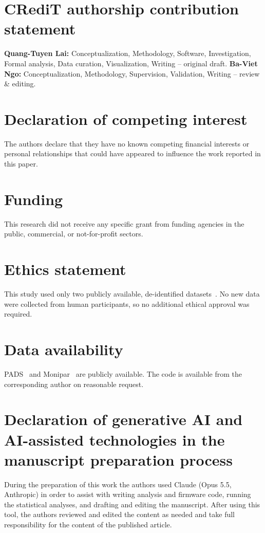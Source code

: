 \documentclass[preprint,12pt]{elsarticle}
\begin{document}
\section*{CRediT authorship contribution statement}
\textbf{Quang-Tuyen Lai:} Conceptualization, Methodology, Software, Investigation, Formal analysis, Data curation, Visualization, Writing -- original draft. \textbf{Ba-Viet Ngo:} Conceptualization, Methodology, Supervision, Validation, Writing -- review \& editing.

\section*{Declaration of competing interest}
The authors declare that they have no known competing financial interests or personal relationships that could have appeared to influence the work reported in this paper.

\section*{Funding}
This research did not receive any specific grant from funding agencies in the public, commercial, or not-for-profit sectors.

\section*{Ethics statement}
This study used only two publicly available, de-identified datasets~\cite{PADSdata,MoniparData}. No new data were collected from human participants, so no additional ethical approval was required.

\section*{Data availability}
PADS~\cite{PADSdata} and Monipar~\cite{MoniparData} are publicly available. The code is available from the corresponding author on reasonable request.

\section*{Declaration of generative AI and AI-assisted technologies in the manuscript preparation process}
During the preparation of this work the authors used Claude (Opus 5.5, Anthropic) in order to assist with writing analysis and firmware code, running the statistical analyses, and drafting and editing the manuscript. After using this tool, the authors reviewed and edited the content as needed and take full responsibility for the content of the published article.



\end{document}
